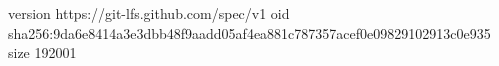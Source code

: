 version https://git-lfs.github.com/spec/v1
oid sha256:9da6e8414a3e3dbb48f9aadd05af4ea881c787357acef0e09829102913c0e935
size 192001
